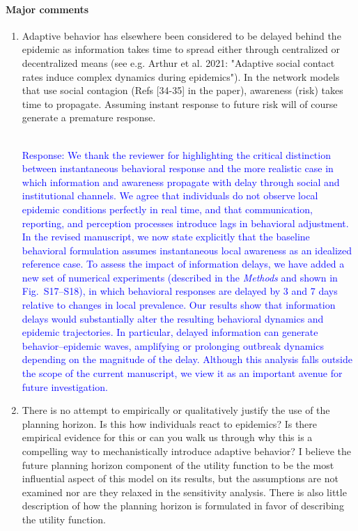 \documentclass{article}
\newcommand{\blue}[1]{{\textcolor{blue}{#1}}}
\begin{document}
\paragraph{Major comments}
\begin{enumerate}
    \item Adaptive behavior has elsewhere been considered to be delayed behind the epidemic as information takes time to spread either through centralized or decentralized means (see e.g. Arthur et al. 2021: "Adaptive social contact rates induce complex dynamics during epidemics"). In the network models that use social contagion (Refs [34-35] in the paper), awareness (risk) takes time to propagate. Assuming instant response to future risk will of course generate a premature response.

    \blue{\\Response: 
    We thank the reviewer for highlighting the critical distinction between instantaneous behavioral response and the more realistic case in which information and awareness propagate with delay through social and institutional channels. We agree that individuals do not observe local epidemic conditions perfectly in real time, and that communication, reporting, and perception processes introduce lags in behavioral adjustment. 
    In the revised manuscript, we now state explicitly that the baseline behavioral formulation assumes instantaneous local awareness as an idealized reference case. To assess the impact of information delays, we have added a new set of numerical experiments (described in the \textit{Methods} and shown in Fig.~S17–S18), in which behavioral responses are delayed by 3 and 7 days relative to changes in local prevalence.
    Our results show that information delays would substantially alter the resulting behavioral dynamics and epidemic trajectories. In particular, delayed information can generate behavior–epidemic waves, amplifying or prolonging outbreak dynamics depending on the magnitude of the delay. Although this analysis falls outside the scope of the current manuscript, we view it as an important avenue for future investigation.
    }

    \item There is no attempt to empirically or qualitatively justify the use of the planning horizon. Is this how individuals react to epidemics? Is there empirical evidence for this or can you walk us through why this is a compelling way to mechanistically introduce adaptive behavior? I believe the future planning horizon component of the utility function to be the most influential aspect of this model on its results, but the assumptions are not examined nor are they relaxed in the sensitivity analysis. There is also little description of how the planning horizon is formulated in favor of describing the utility function.
    

\end{enumerate}
\end{document}
